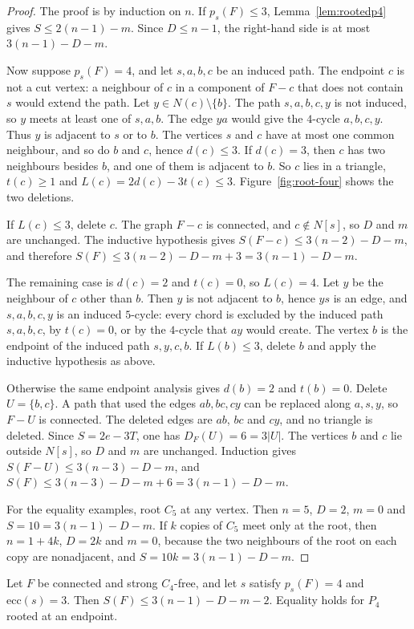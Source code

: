 \documentclass[ASNA]{USG}
\theoremstyle{WBstyletwo}
\numberwithin{equation}{section}
\newcommand{\pp}{p}
\begin{document}
\begin{proof}
The proof is by induction on $n$. If $\pp_s(F)\le 3$, Lemma~\ref{lem:rootedp4} gives $S\le 2(n-1)-m$. Since $D\le n-1$, the right-hand side is at most $3(n-1)-D-m$.

Now suppose $\pp_s(F)=4$, and let $s,a,b,c$ be an induced path. The endpoint $c$ is not a cut vertex: a neighbour of $c$ in a component of $F-c$ that does not contain $s$ would extend the path. Let $y\in N(c)\setminus\{b\}$. The path $s,a,b,c,y$ is not induced, so $y$ meets at least one of $s,a,b$. The edge $ya$ would give the $4$-cycle $a,b,c,y$. Thus $y$ is adjacent to $s$ or to $b$. The vertices $s$ and $c$ have at most one common neighbour, and so do $b$ and $c$, hence $d(c)\le 3$. If $d(c)=3$, then $c$ has two neighbours besides $b$, and one of them is adjacent to $b$. So $c$ lies in a triangle, $t(c)\ge 1$ and $L(c)=2d(c)-3t(c)\le 3$. Figure~\ref{fig:root-four} shows the two deletions.

If $L(c)\le 3$, delete $c$. The graph $F-c$ is connected, and $c\notin N[s]$, so $D$ and $m$ are unchanged. The inductive hypothesis gives $S(F-c)\le 3(n-2)-D-m$, and therefore $S(F)\le 3(n-2)-D-m+3=3(n-1)-D-m$.

The remaining case is $d(c)=2$ and $t(c)=0$, so $L(c)=4$. Let $y$ be the neighbour of $c$ other than $b$. Then $y$ is not adjacent to $b$, hence $ys$ is an edge, and $s,a,b,c,y$ is an induced $5$-cycle: every chord is excluded by the induced path $s,a,b,c$, by $t(c)=0$, or by the $4$-cycle that $ay$ would create. The vertex $b$ is the endpoint of the induced path $s,y,c,b$. If $L(b)\le 3$, delete $b$ and apply the inductive hypothesis as above.

Otherwise the same endpoint analysis gives $d(b)=2$ and $t(b)=0$. Delete $U=\{b,c\}$. A path that used the edges $ab,bc,cy$ can be replaced along $a,s,y$, so $F-U$ is connected. The deleted edges are $ab$, $bc$ and $cy$, and no triangle is deleted. Since $S=2e-3T$, one has $D_F(U)=6=3|U|$. The vertices $b$ and $c$ lie outside $N[s]$, so $D$ and $m$ are unchanged. Induction gives $S(F-U)\le 3(n-3)-D-m$, and $S(F)\le 3(n-3)-D-m+6=3(n-1)-D-m$.

For the equality examples, root $C_5$ at any vertex. Then $n=5$, $D=2$, $m=0$ and $S=10=3(n-1)-D-m$. If $k$ copies of $C_5$ meet only at the root, then $n=1+4k$, $D=2k$ and $m=0$, because the two neighbours of the root on each copy are nonadjacent, and $S=10k=3(n-1)-D-m$.
\end{proof}

\begin{proposition}\label{prop:root4plus}
Let $F$ be connected and strong $C_4$-free, and let $s$ satisfy $\pp_s(F)=4$ and $\mathrm{ecc}(s)=3$. Then $S(F)\le 3(n-1)-D-m-2$. Equality holds for $P_4$ rooted at an endpoint.
\end{proposition}
\end{document}
